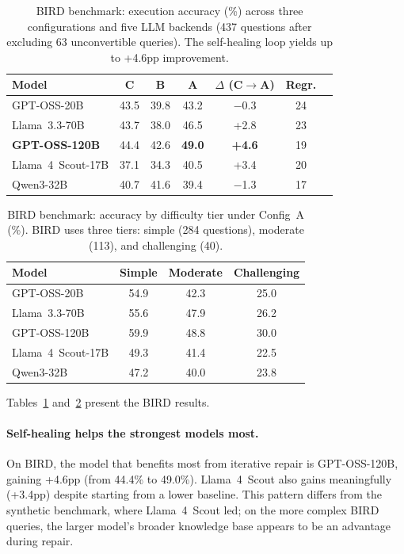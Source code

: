 \documentclass{article}
\begin{document}
\begin{table}[ht]
\centering
\caption{BIRD benchmark: execution accuracy (\%) across three configurations and five LLM backends (437 questions after excluding 63 unconvertible queries). The self-healing loop yields up to +4.6pp improvement.}
\label{tab:bird_results}
\small
\begin{tabular}{@{}lcccccc@{}}
\toprule
\textbf{Model} & \textbf{C} & \textbf{B} & \textbf{A} & \textbf{$\Delta$ (C$\to$A)} & \textbf{Regr.} \\
\midrule
GPT-OSS-20B                      & 43.5 & 39.8 & 43.2 & $-$0.3 & 24 \\
Llama~3.3-70B                    & 43.7 & 38.0 & 46.5 & +2.8  & 23 \\
\textbf{GPT-OSS-120B}            & 44.4 & 42.6 & \textbf{49.0} & \textbf{+4.6} & 19 \\
Llama~4~Scout-17B                & 37.1 & 34.3 & 40.5 & +3.4  & 20 \\
Qwen3-32B                        & 40.7 & 41.6 & 39.4 & $-$1.3 & 17 \\
\bottomrule
\end{tabular}
\end{table}

\begin{table}[ht]
\centering
\caption{BIRD benchmark: accuracy by difficulty tier under Config~A (\%). BIRD uses three tiers: simple (284 questions), moderate (113), and challenging (40).}
\label{tab:bird_difficulty}
\small
\begin{tabular}{@{}lccc@{}}
\toprule
\textbf{Model} & \textbf{Simple} & \textbf{Moderate} & \textbf{Challenging} \\
\midrule
GPT-OSS-20B          & 54.9 & 42.3 & 25.0 \\
Llama~3.3-70B        & 55.6 & 47.9 & 26.2 \\
GPT-OSS-120B         & 59.9 & 48.8 & 30.0 \\
Llama~4~Scout-17B    & 49.3 & 41.4 & 22.5 \\
Qwen3-32B            & 47.2 & 40.0 & 23.8 \\
\bottomrule
\end{tabular}
\end{table}

Tables~\ref{tab:bird_results} and~\ref{tab:bird_difficulty} present the BIRD results.

\paragraph{Self-healing helps the strongest models most.} On BIRD, the model that benefits most from iterative repair is GPT-OSS-120B, gaining +4.6pp (from 44.4\% to 49.0\%). Llama~4~Scout also gains meaningfully (+3.4pp) despite starting from a lower baseline. This pattern differs from the synthetic benchmark, where Llama~4~Scout led; on the more complex BIRD queries, the larger model's broader knowledge base appears to be an advantage during repair.
\end{document}
